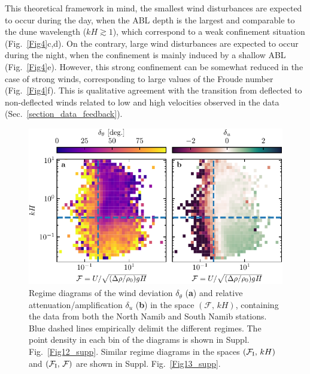 This theoretical framework in mind, the smallest wind disturbances are expected to occur during the day, when the ABL depth is the largest and comparable to the dune wavelength ($k H \gtrsim 1$), which correspond to a weak confinement situation (Fig.~\ref{Fig4}c,d). On the contrary, large wind disturbances are expected to occur during the night, when the confinement is mainly induced by a shallow ABL (Fig.~\ref{Fig4}e). However, this strong confinement can be somewhat reduced in the case of strong winds, corresponding to large values of the Froude number (Fig.~\ref{Fig4}f). This is qualitative agreement with the transition from deflected to non-deflected winds related to low and high velocities observed in the data (Sec.~\ref{section_data_feedback}).


\begin{figure}
\centering
\includegraphics[scale=1]{Figures/Figure5.pdf}
\caption{Regime diagrams of the wind deviation $\delta_{\theta}$ (\textbf{a}) and relative attenuation/amplification $\delta_{u}$ (\textbf{b}) in the space $(\mathcal{F}, \, kH)$, containing the data from both the North Namib and South Namib stations. Blue dashed lines empirically delimit the different regimes. The point density in each bin of the diagrams is shown in Suppl. Fig.~\ref{Fig12_supp}. Similar regime diagrams in the spaces $(\mathcal{F}_{\textup{I}}, \, kH)$ and $(\mathcal{F}_{\textup{I}}, \, \mathcal{F})$ are shown in Suppl. Fig.~\ref{Fig13_supp}. }
\label{Fig5}
\end{figure}


